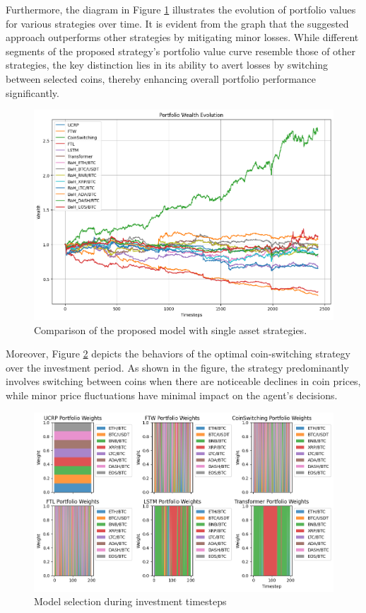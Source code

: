 Furthermore, the diagram in Figure \ref{fig:versions} illustrates the evolution of portfolio values for various strategies over time. It is evident from the graph that the suggested approach outperforms other strategies by mitigating minor losses. While different segments of the proposed strategy's portfolio value curve resemble those of other strategies, the key distinction lies in its ability to avert losses by switching between selected coins, thereby enhancing overall portfolio performance significantly.

\begin{figure}[h]
	\centering
	\includegraphics[scale=0.6]{./ms1.png}
	\caption{Comparison of the proposed model with single asset strategies.}
	\label{fig:versions}
\end{figure}

Moreover, Figure \ref{fig:changes1} depicts the behaviors of the optimal coin-switching strategy over the investment period. As shown in the figure, the strategy predominantly involves switching between coins when there are noticeable declines in coin prices, while minor price fluctuations have minimal impact on the agent's decisions.



\begin{figure}[h]
	\centering
	\includegraphics[scale=0.6]{./changes1.png}
	\caption{Model selection during investment timesteps}
	\label{fig:changes1}
\end{figure}

